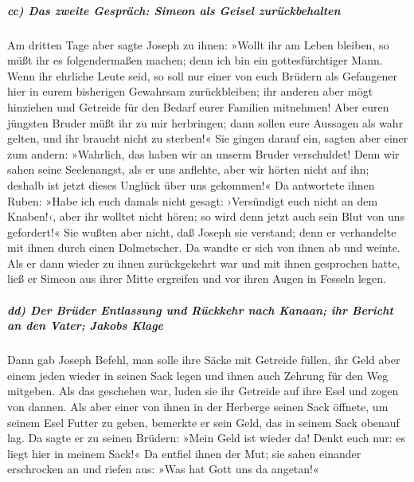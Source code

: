 \hypertarget{cc-das-zweite-gespruxe4ch-simeon-als-geisel-zuruxfcckbehalten}{%
\subparagraph{cc) Das zweite Gespräch: Simeon als Geisel
zurückbehalten}\label{cc-das-zweite-gespruxe4ch-simeon-als-geisel-zuruxfcckbehalten}}

 Am dritten Tage aber sagte Joseph zu ihnen: »Wollt ihr
am Leben bleiben, so müßt ihr es folgendermaßen machen; denn ich bin ein
gottesfürchtiger Mann.  Wenn ihr ehrliche Leute seid, so
soll nur einer von euch Brüdern als Gefangener hier in eurem bisherigen
Gewahrsam zurückbleiben; ihr anderen aber mögt hinziehen und Getreide
für den Bedarf eurer Familien mitnehmen!  Aber euren
jüngsten Bruder müßt ihr zu mir herbringen; dann sollen eure Aussagen
als wahr gelten, und ihr braucht nicht zu sterben!« Sie gingen darauf
ein,  sagten aber einer zum andern: »Wahrlich, das haben
wir an unserm Bruder verschuldet! Denn wir sahen seine Seelenangst, als
er uns anflehte, aber wir hörten nicht auf ihn; deshalb ist jetzt dieses
Unglück über uns gekommen!«  Da antwortete ihnen Ruben:
»Habe ich euch damals nicht gesagt: ›Versündigt euch nicht an dem
Knaben!‹, aber ihr wolltet nicht hören; so wird denn jetzt auch sein
Blut von uns gefordert!«  Sie wußten aber nicht, daß
Joseph sie verstand; denn er verhandelte mit ihnen durch einen
Dolmetscher.  Da wandte er sich von ihnen ab und weinte.
Als er dann wieder zu ihnen zurückgekehrt war und mit ihnen gesprochen
hatte, ließ er Simeon aus ihrer Mitte ergreifen und vor ihren Augen in
Fesseln legen.

\hypertarget{dd-der-bruxfcder-entlassung-und-ruxfcckkehr-nach-kanaan-ihr-bericht-an-den-vater-jakobs-klage}{%
\subparagraph{dd) Der Brüder Entlassung und Rückkehr nach Kanaan; ihr
Bericht an den Vater; Jakobs
Klage}\label{dd-der-bruxfcder-entlassung-und-ruxfcckkehr-nach-kanaan-ihr-bericht-an-den-vater-jakobs-klage}}

 Dann gab Joseph Befehl, man solle ihre Säcke mit
Getreide füllen, ihr Geld aber einem jeden wieder in seinen Sack legen
und ihnen auch Zehrung für den Weg mitgeben. Als das geschehen war,
 luden sie ihr Getreide auf ihre Esel und zogen von
dannen.  Als aber einer von ihnen in der Herberge seinen
Sack öffnete, um seinem Esel Futter zu geben, bemerkte er sein Geld, das
in seinem Sack obenauf lag.  Da sagte er zu seinen
Brüdern: »Mein Geld ist wieder da! Denkt euch nur: es liegt hier in
meinem Sack!« Da entfiel ihnen der Mut; sie sahen einander erschrocken
an und riefen aus: »Was hat Gott uns da angetan!«

